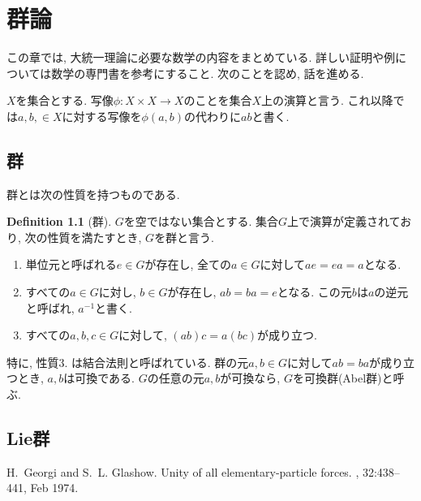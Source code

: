 \documentclass[titlepage]{jsbook}
\theoremstyle{plain}
\theoremstyle{definition}
\newtheorem{dfn}{Definition}
\begin{document}


\chapter{群論}
%
%
 この章では, 大統一理論に必要な数学の内容をまとめている.
 詳しい証明や例については数学の専門書を参考にすること.
 次のことを認め, 話を進める.

 $X$を集合とする.
 写像$\phi: X\times X \rightarrow X$のことを集合$X$上の演算と言う.
 これ以降では$a,b,\in X$に対する写像を$\phi(a, b)$の代わりに$ab$と書く.
\section{群}
群とは次の性質を持つものである.
\begin{dfn}[群]
  $G$を空ではない集合とする. 集合$G$上で演算が定義されており, 次の性質を満たすとき, $G$を群と言う.
  \begin{enumerate}
    \item 単位元と呼ばれる$e\in G$が存在し, 全ての$a\in G$に対して$ae=ea=a$となる.
    \item すべての$a\in G$に対し, $b\in G$が存在し, $ab=ba=e$となる. この元$b$は$a$の逆元と呼ばれ, $a^{-1}$と書く.
    \item すべての$a, b, c \in G$に対して, $(ab)c=a(bc)$が成り立つ.
  \end{enumerate}
\end{dfn}
特に, 性質3. は結合法則と呼ばれている.
群の元$a, b\in G$に対して$ab=ba$が成り立つとき, $a, b$は可換である.
$G$の任意の元$a, b$が可換なら, $G$を可換群(Abel群)と呼ぶ.
\section{Lie群}







\begin{thebibliography}{1}

H.~Georgi and S.~L. Glashow.
\newblock Unity of all elementary-particle forces.
, 32:438--441, Feb 1974.

\end{thebibliography}

\end{document}
